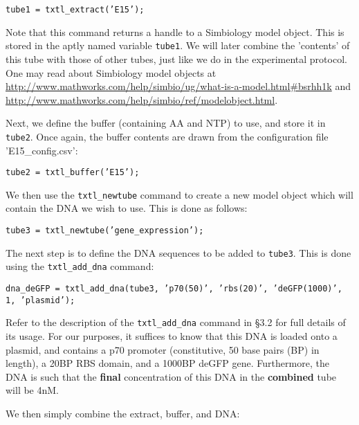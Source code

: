 				\begin{flushleft}
						\texttt{tube1 = txtl\_extract('E15');} 
				\end{flushleft}	
				
				Note that this command returns a handle to a Simbiology model object. This is stored in the aptly named variable \texttt{tube1}. We will later combine the 'contents' of this tube with those of other tubes, just like we do in the experimental protocol. One may read about Simbiology model objects at \url{http://www.mathworks.com/help/simbio/ug/what-is-a-model.html#bsrhh1k} and \url{http://www.mathworks.com/help/simbio/ref/modelobject.html}.
				
Next, we define the buffer (containing AA and NTP) to use, and store it in \texttt{tube2}. Once again, the buffer contents are drawn from the configuration file \textsf{'E15\_config.csv'}:

				\begin{flushleft}
						\texttt{tube2 = txtl\_buffer('E15');} \\	
				\end{flushleft}	 
		
We then use the \texttt{txtl\_newtube} command to create a new model object which will contain the DNA we wish to use. This is done as follows:
		
				\begin{flushleft}
						\texttt{tube3 = txtl\_newtube('gene\_expression');} \\	
				\end{flushleft}	 
				
The next step is to define the DNA sequences to be added to \texttt{tube3}. This is done using the \texttt{txtl\_add\_dna} command:

				\begin{flushleft}
						\texttt{dna\_deGFP = txtl\_add\_dna(tube3, 'p70(50)', 'rbs(20)', 'deGFP(1000)', 1, 'plasmid');} \\	
				\end{flushleft}
Refer to the description of the \texttt{txtl\_add\_dna} command in \S 3.2 for full details of its usage. For our purposes, it suffices to know that this DNA is loaded onto a plasmid, and contains a p70 promoter (constitutive, 50 base pairs (BP) in length), a 20BP RBS domain, and a 1000BP deGFP gene. Furthermore, the DNA is such that the \textbf{final} concentration of this DNA in the \textbf{combined} tube will be 4nM. 

We then simply combine the extract, buffer, and DNA:

